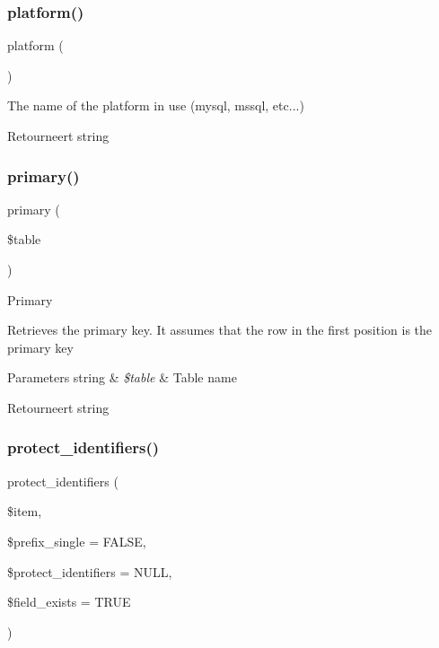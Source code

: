 \subsubsection{\texorpdfstring{platform()}{platform()}}
{\footnotesize\ttfamily platform (\begin{DoxyParamCaption}{ }\end{DoxyParamCaption})}

The name of the platform in use (mysql, mssql, etc...)

\begin{DoxyReturn}{Retourneert}
string 
\end{DoxyReturn}
\mbox{\label{class_c_i___d_b__driver_a68e5f4a4a6fdb79a9a403b045c59b618}} 
\subsubsection{\texorpdfstring{primary()}{primary()}}
{\footnotesize\ttfamily primary (\begin{DoxyParamCaption}\item[{}]{\$table }\end{DoxyParamCaption})}

Primary

Retrieves the primary key. It assumes that the row in the first position is the primary key


\begin{DoxyParams}[1]{Parameters}
string & {\em \$table} & Table name \\
\hline
\end{DoxyParams}
\begin{DoxyReturn}{Retourneert}
string 
\end{DoxyReturn}
\mbox{\label{class_c_i___d_b__driver_ade8e28ac268bbe2f985c5359bc949f21}} 
\subsubsection{\texorpdfstring{protect\_identifiers()}{protect\_identifiers()}}
{\footnotesize\ttfamily protect\+\_\+identifiers (\begin{DoxyParamCaption}\item[{}]{\$item,  }\item[{}]{\$prefix\+\_\+single = {\ttfamily FALSE},  }\item[{}]{\$protect\+\_\+identifiers = {\ttfamily NULL},  }\item[{}]{\$field\+\_\+exists = {\ttfamily TRUE} }\end{DoxyParamCaption})}

